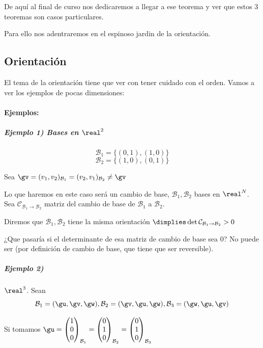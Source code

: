 De aquí al final de curso nos dedicaremos a llegar a ese teorema y ver que estos 3 teoremas son casos particulares. 

Para ello nos adentraremos en el espinoso jardin de la orientación.

\subsection{Orientación} 
El tema de la orientación tiene que ver con tener cuidado con el orden. Vamos a ver los ejemplos de pocas dimensiones:

\paragraph{Ejemplos:}

\subparagraph{Ejemplo 1) Bases en $\real^2$}

\[\mathcal{B}_1 = \{(0,1),(1,0)\}\]
\[\mathcal{B}_2 = \{(1,0),(0,1)\}\]

Sea $\gv = (v_1,v_2)_{\mathcal{B}_1} = (v_2,v_1)_{\mathcal{B}_2} \neq \gv$

Lo que haremos en este caso será un cambio de base, $\mathcal{B}_1,\mathcal{B}_2$ bases en $\real^N$. Sea $\mathcal{C}_{\mathcal{B}_1\to\mathcal{B}_2}$ matriz del cambio de base de $\mathcal{B}_1$ a $\mathcal{B}_2$.

\begin{defn}[Orientación]
Diremos que $\mathcal{B}_1,\mathcal{B}_2$ tiene la misma orientación $\dimplies \det \mathcal{C}_{\mathcal{B}_1\to\mathcal{B}_2} > 0$
\end{defn}

¿Que pasaría si el determinante de esa matriz de cambio de base sea 0? No puede ser (por definición de cambio de base, que tiene que ser reversible).

\subparagraph{Ejemplo 2)} $\real^3$.
Sean
\[\mathcal{B}_1 = (\gu,\gv,\gw),\mathcal{B}_2 = (\gv,\gu,\gw),\mathcal{B}_3 = (\gw,\gu,\gv)\]

Si tomamos $\gu = \begin{pmatrix} 1\\0\\0\end{pmatrix}_{\mathcal{B}_1} = \begin{pmatrix}0\\1\\0\end{pmatrix}_{\mathcal{B}_2} = \begin{pmatrix}0\\1\\0\end{pmatrix}_{\mathcal{B}_3} $

